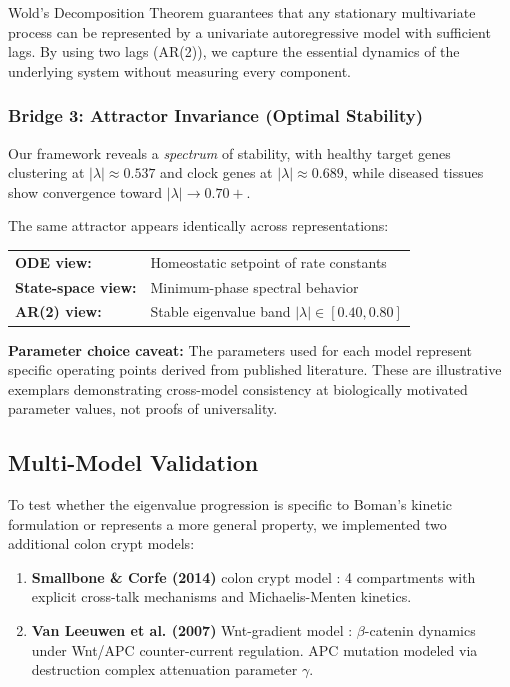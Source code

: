\documentclass[11pt,a4paper]{article}
\begin{document}
Wold's Decomposition Theorem \citep{wold1938study} guarantees that any stationary multivariate process can be represented by a univariate autoregressive model with sufficient lags. By using two lags (AR(2)), we capture the essential dynamics of the underlying system without measuring every component.

\subsubsection*{Bridge 3: Attractor Invariance (Optimal Stability)}

Our framework reveals a \textit{spectrum} of stability, with healthy target genes clustering at $|\lambda| \approx 0.537$ and clock genes at $|\lambda| \approx 0.689$, while diseased tissues show convergence toward $|\lambda| \to 0.70+$.

The same attractor appears identically across representations:
\begin{center}
\begin{tabular}{ll}
\textbf{ODE view:} & Homeostatic setpoint of rate constants \\
\textbf{State-space view:} & Minimum-phase spectral behavior \\
\textbf{AR(2) view:} & Stable eigenvalue band $|\lambda| \in [0.40, 0.80]$
\end{tabular}
\end{center}

\textbf{Parameter choice caveat:} The parameters used for each model represent specific operating points derived from published literature. These are illustrative exemplars demonstrating cross-model consistency at biologically motivated parameter values, not proofs of universality.

\subsection{Multi-Model Validation}

To test whether the eigenvalue progression is specific to Boman's kinetic formulation or represents a more general property, we implemented two additional colon crypt models:

\begin{enumerate}
    \item \textbf{Smallbone \& Corfe (2014)} colon crypt model \citep{smallbone2014crosstalk}: 4 compartments with explicit cross-talk mechanisms and Michaelis-Menten kinetics.
    \item \textbf{Van Leeuwen et al. (2007)} Wnt-gradient model \citep{vanleeuwen2007wnt}: $\beta$-catenin dynamics under Wnt/APC counter-current regulation. APC mutation modeled via destruction complex attenuation parameter $\gamma$.
\end{enumerate}
\end{document}
